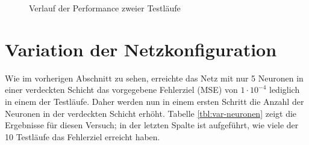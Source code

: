 \begin{figure}
  \centering
  \caption{Verlauf der Performance zweier Testläufe}
  \label{fig:plot-runs}
\end{figure}

\section{Variation der Netzkonfiguration}
Wie im vorherigen Abschnitt zu sehen, erreichte das Netz mit nur 5 Neuronen in 
einer verdeckten Schicht das vorgegebene Fehlerziel (MSE) von $1 \cdot 10^{-4}$
lediglich in einem der Testläufe. Daher werden nun in einem ersten Schritt die
Anzahl der Neuronen in der verdeckten Schicht erhöht. Tabelle
\ref{tbl:var-neuronen} zeigt die Ergebnisse für diesen Versuch; in der letzten
Spalte ist aufgeführt, wie viele der 10 Testläufe das Fehlerziel erreicht haben. 

